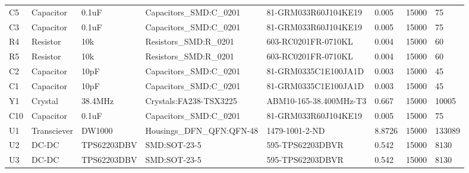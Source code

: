 \begin{landscape}
\begin{table}[]
\begin{tabular}{llllllll}
C5             & Capacitor     & 0.1uF                      & Capacitors\_SMD:C\_0201         & 81-GRM033R60J104KE19                 & 0.005                & 15000           & 75                   \\
C3             & Capacitor     & 0.1uF                      & Capacitors\_SMD:C\_0201         & 81-GRM033R60J104KE19                 & 0.005                & 15000           & 75                   \\
R4             & Resistor      & 10k                        & Resistors\_SMD:R\_0201          & 603-RC0201FR-0710KL                  & 0.004                & 15000           & 60                   \\
R5             & Resistor      & 10k                        & Resistors\_SMD:R\_0201          & 603-RC0201FR-0710KL                  & 0.004                & 15000           & 60                   \\
C2             & Capacitor     & 10pF                       & Capacitors\_SMD:C\_0201         & 81-GRM0335C1E100JA1D                 & 0.003                & 15000           & 45                   \\
C1             & Capacitor     & 10pF                       & Capacitors\_SMD:C\_0201         & 81-GRM0335C1E100JA1D                 & 0.003                & 15000           & 45                   \\
Y1             & Crystal       & 38.4MHz                    & Crystals:FA238-TSX3225          & ABM10-165-38.400MHz-T3               & 0.667                & 15000           & 10005                \\
C10            & Capacitor     & 0.1uF                      & Capacitors\_SMD:C\_0201         & 81-GRM033R60J104KE19                 & 0.005                & 15000           & 75                   \\
U1             & Transciever   & DW1000                     & Housings\_DFN\_QFN:QFN-48       & 1479-1001-2-ND                       & 8.8726               & 15000           & 133089               \\
U2             & DC-DC         & TPS62203DBV                & SMD:SOT-23-5                    & 595-TPS62203DBVR                     & 0.542                & 15000           & 8130                 \\
U3             & DC-DC         & TPS62203DBV                & SMD:SOT-23-5                    & 595-TPS62203DBVR                     & 0.542                & 15000           & 8130                 \\

\end{tabular}
\end{table}
\end{landscape}

